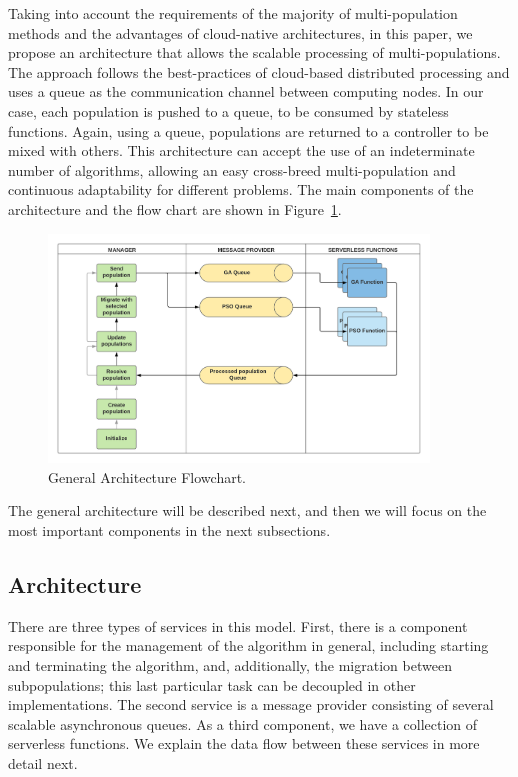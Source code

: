 \documentclass[runningheads]{llncs}
\begin{document}
Taking into account the requirements of the majority of 
multi-population methods and the advantages of cloud-native %
architectures, in this paper, we propose an architecture 
that allows the scalable processing of multi-populations. 
The approach follows the best-practices of cloud-based 
distributed processing and uses a queue as the communication 
channel between computing nodes. In our case,  
each population is pushed to a queue, to be consumed by stateless functions.
Again, using a queue, populations are returned to a controller to be mixed with others.
This architecture can accept the use of an
indeterminate number of algorithms, allowing an easy cross-breed
multi-population and continuous adaptability for different problems. 
The main components of the architecture and the flow chart are shown 
in Figure~\ref{flow}.


\begin{figure}[htp]
  \centering
  \includegraphics[width=0.9\textwidth]{img/architecture.png}
  \caption{General Architecture Flowchart.} \label{flow}
  \end{figure}

The general architecture will be described next, and then we will
focus on the most important components in the next subsections.

\subsection{Architecture}

There are three types of services in this model. First, there is a component
responsible for the management of the algorithm in general, including
starting and terminating the algorithm, and, additionally, the migration between subpopulations; this
last particular task can be decoupled in other implementations. The second service is
a message provider consisting of several scalable asynchronous queues. As a
third component, we have a collection of serverless functions. We explain the 
data flow between these services in more detail next.  
\end{document}
